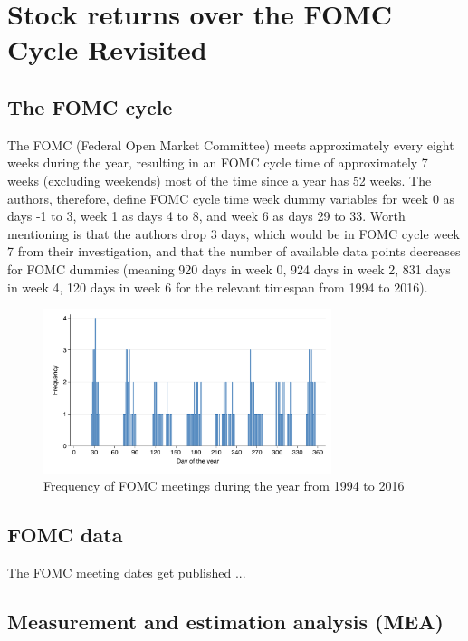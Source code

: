 \chapter{Stock returns over the FOMC Cycle Revisited }


\section{The FOMC cycle}

The FOMC (Federal Open Market Committee) meets approximately every eight weeks during the year,  resulting in an FOMC cycle time of approximately 7 weeks (excluding weekends) most of the time since a year has 52 weeks. The authors, therefore, define FOMC cycle time week dummy variables for week 0 as days -1 to 3, week 1 as days 4 to 8, and week 6 as days 29 to 33. Worth mentioning is that the authors drop 3 days, which would be in FOMC cycle week 7 from their investigation, and that the number of available data points decreases for FOMC dummies (meaning 920 days in week 0,  924 days in week 2,  831 days in week 4,  120 days in week 6 for the relevant timespan from 1994 to 2016).

\label{cies19_fig2}
\begin{figure}[h]
    \centering
    \includegraphics[width=0.75\textwidth]{figures/cies19/fig2}
    \caption{Frequency of FOMC meetings during the year from 1994 to 2016 \parencite{cieslak_stock_2019}}
\end{figure}


\section{FOMC data}

The FOMC meeting dates get published ...


\section{Measurement and estimation analysis (MEA)}


